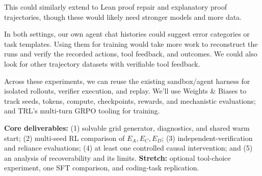 \documentclass[11pt]{article}
\begin{document}
This could similarly extend to Lean proof repair and explanatory proof trajectories, though these would likely need stronger models and more data.

In both settings, our own agent chat histories could suggest error categories or task templates. Using them for training would take more work to reconstruct the runs and verify the recorded actions, tool feedback, and outcomes. We could also look for other trajectory datasets with verifiable tool feedback.

Across these experiments, we can reuse the existing sandbox/agent harness for isolated rollouts, verifier execution, and replay. We'll use Weights \& Biases to track seeds, tokens, compute, checkpoints, rewards, and mechanistic evaluations; and TRL's multi-turn GRPO tooling for training.

\textbf{Core deliverables:} (1) solvable grid generator, diagnostics, and shared warm start; (2) multi-seed RL comparison of $E_A,E_C,E_D$; (3) independent-verification and reliance evaluations; (4) at least one controlled causal intervention; and (5) an analysis of recoverability and its limits. \textbf{Stretch:} optional tool-choice experiment, one SFT comparison, and coding-task replication.
\end{document}
